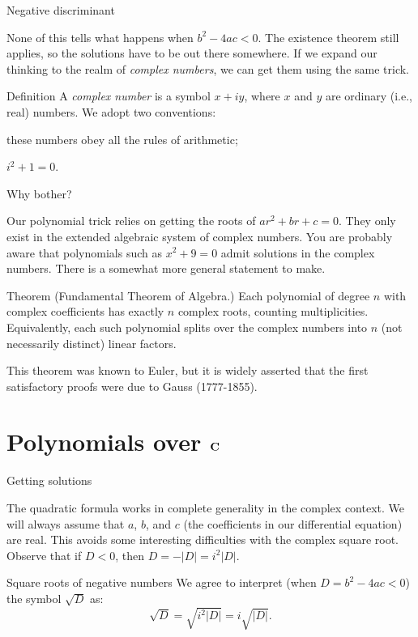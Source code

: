 \documentclass{beamer}
\begin{document}
\begin{frame}{Negative discriminant}

  None of this tells what happens when $b^2 - 4ac < 0$. The existence theorem still applies, so the solutions have to be out there somewhere. If we expand our thinking to the realm of \emph{complex numbers}, we can get them using the same trick.

  \begin{block}{Definition}
    A \emph{complex number} is a symbol $x + iy$, where $x$ and $y$ are ordinary (i.e., real) numbers. We adopt two conventions:
    \begin{inparaenum}[(1)]
      \item these numbers obey all the rules of arithmetic;
      \item $i^2 + 1 = 0$.
    \end{inparaenum}
  \end{block}

\end{frame}

\begin{frame}{Why bother?}

  Our polynomial trick relies on getting the roots of $ar^2 + br + c = 0$. They only exist in the extended algebraic system of complex numbers. You are probably aware that polynomials such as $x^2 + 9 = 0$ admit solutions in the complex numbers. There is a somewhat more general statement to make.

  \begin{block}{Theorem}
    (Fundamental Theorem of Algebra.) Each polynomial of degree $n$ with complex coefficients has exactly $n$ complex roots, counting multiplicities. Equivalently, each such polynomial splits over the complex numbers into $n$ (not necessarily distinct) linear factors.
  \end{block}

  This theorem was known to Euler, but it is widely asserted that the first satisfactory proofs were due to Gauss (1777-1855). 

\end{frame}

\section{Polynomials over $\mathbf{C}$}

\begin{frame}{Getting solutions}
  
  The quadratic formula works in complete generality in the complex context. We will always assume that $a$, $b$, and $c$ (the coefficients in our differential equation) are real. This avoids some interesting difficulties with the complex square root. Observe that if $D < 0$, then $D = -|D| = i^2 |D|$.

  \begin{block}{Square roots of negative numbers}
  We agree to interpret (when $D = b^2 - 4ac < 0$) the symbol $\sqrt{D}$ as:
    \[
      \sqrt{D} = \sqrt{i^2 |D|} = i \sqrt{|D|}.
    \]
  \end{block}

\end{frame}
\end{document}
